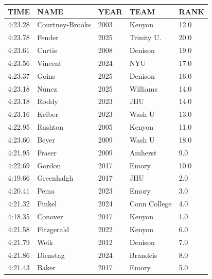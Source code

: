 \begin{table}[H]
\begin{minipage}[t]{0.48\textwidth}
\begin{tabular}{@{}p{1.8cm}p{2.8cm}p{1.2cm}p{1.4cm}p{0.8cm}@{}}
\hline
    \textbf{TIME} & \textbf{NAME} & \textbf{YEAR} & \textbf{TEAM} & \textbf{RANK} \\
\hline
    4:23.28 & Courtney-Brooks & 2003 & Kenyon & 12.0 \\
    4:23.78 & Fender & 2025 & Trinity U. & 20.0 \\
    4:23.61 & Curtis & 2008 & Denison & 19.0 \\
    4:23.56 & Vincent & 2024 & NYU & 17.0 \\
    4:23.37 & Goins & 2025 & Denison & 16.0 \\
    4:23.18 & Nunez & 2025 & Williams & 14.0 \\
    4:23.18 & Roddy & 2023 & JHU & 14.0 \\
    4:23.16 & Kelber & 2023 & Wash U & 13.0 \\
    4:22.95 & Rushton & 2005 & Kenyon & 11.0 \\
    4:23.60 & Beyer & 2009 & Wash U & 18.0 \\
    4:21.95 & Fraser & 2009 & Amherst & 9.0 \\
    4:22.69 & Gordon & 2017 & Emory & 10.0 \\
    4:19.66 & Greenhalgh & 2017 & JHU & 2.0 \\
    4:20.41 & Pema & 2023 & Emory & 3.0 \\
    4:21.32 & Finkel & 2024 & Conn College & 4.0 \\
    4:18.35 & Conover & 2017 & Kenyon & 1.0 \\
    4:21.58 & Fitzgerald & 2022 & Kenyon & 6.0 \\
    4:21.79 & Weik & 2012 & Denison & 7.0 \\
    4:21.86 & Dienstag & 2024 & Brandeis & 8.0 \\
    4:21.43 & Baker & 2017 & Emory & 5.0 \\
\hline
\end{tabular}
\end{minipage}
\end{table}

